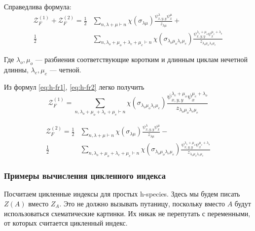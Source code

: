 \begin{statement}
Справедлива формула:
\begin{equation}
\label{eq:h-fr2}
\begin{split}
\mathcal Z_F^{(1)} + \mathcal Z_F^{(2)} = 
\frac{1}{2}&
\sum_{n, \lambda + \mu \vdash n}\chi(\sigma_{\lambda \mu})
\frac{\psi_{x, y, y}^{\lambda} \psi_{x}^{\mu}}{z_{\lambda \mu}}
+ \\
\frac{1}{2}&
\sum_{n, \lambda_o + \mu_o + \lambda_e + \mu_e \vdash
n}\chi(\sigma_{\lambda_o \mu_o \lambda_e \mu_e})
\frac{\psi_{x, y, y}^{\lambda_e + \mu_o} \psi_{x}^{\mu_e + 
\lambda_o}}{z_{\lambda_o \mu_o \lambda_e \mu_e}}
\end{split}
\end{equation}
\end{statement}
Где $\lambda_o, \mu_o$ --- разбиения соответствующие коротким и длинным циклам
нечетной длинны, $\lambda_e, \mu_e$ --- четной.

Из формул \ref{eq:h-fr1}, \ref{eq:h-fr2} легко получить
\begin{equation}
\mathcal Z_F^{(1)} = 
\sum_{n, \lambda_o + \mu_o + \lambda_e + \mu_e \vdash
n}\chi(\sigma_{\lambda_o \mu_o \lambda_e \mu_e})
\frac{\psi_{x, y, y}^{\lambda_e + \mu_o} \psi_{x}^{\mu_e + 
\lambda_o}}{z_{\lambda_o \mu_o \lambda_e \mu_e}}
\end{equation}

\begin{equation}
\begin{split}
\mathcal Z_F^{(2)} = 
\frac{1}{2}&
\sum_{n, \lambda + \mu \vdash n}\chi(\sigma_{\lambda \mu})
\frac{\psi_{x, y, y}^{\lambda} \psi_{x}^{\mu}}{z_{\lambda \mu}}
- \\
\frac{1}{2}&
\sum_{n, \lambda_o + \mu_o + \lambda_e + \mu_e \vdash
n}\chi(\sigma_{\lambda_o \mu_o \lambda_e \mu_e})
\frac{\psi_{x, y, y}^{\lambda_e + \mu_o} \psi_{x}^{\mu_e + 
\lambda_o}}{z_{\lambda_o \mu_o \lambda_e \mu_e}}
\end{split}
\end{equation}

\subsubsection{Примеры вычисления цикленного индекса}
Посчитаем цикленные индексы для простых h-species.
Здесь мы будем писать $Z(A)$ вместо $Z_A$. Это не должно вызывать путаницу,
поскольку вместо $A$ будут использоваться схематические картинки. Их
никак не перепутать с переменными, от которых считается цикленный индекс. 

